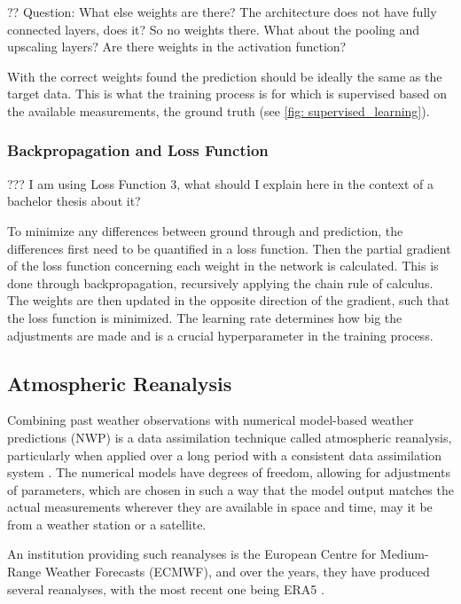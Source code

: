 ?? Question: What else weights are there? The architecture does not have fully connected layers, does it? So no weights there. What about the pooling and upscaling layers? Are there weights in the activation function?

With the correct weights found the prediction should be ideally the same as the target data. This is what the training process is for which is supervised based on the available measurements, the ground truth (see \autoref{fig: supervised_learning}). 

\subsubsection*{Backpropagation and Loss Function}

??? I am using Loss Function 3, what should I explain here in the context of a bachelor thesis about it?

To minimize any differences between ground through and prediction, the differences first need to be quantified in a loss function. Then the partial gradient of the loss function concerning each weight in the network is calculated. This is done through backpropagation, recursively applying the chain rule of calculus. The weights are then updated in the opposite direction of the gradient, such that the loss function is minimized. The learning rate determines how big the adjustments are made and is a crucial hyperparameter in the training process. 

\newpage

\subsection{Atmospheric Reanalysis}
 
Combining past weather observations with numerical model-based weather predictions (NWP)
is a data assimilation technique called atmospheric reanalysis, particularly when applied over a long period with a consistent data assimilation system \cite{Poli2016ERA20C, ECMWF2020dataassimilation}. The numerical models have degrees of freedom, allowing for adjustments of parameters, which are chosen in such a way that the model output matches the actual measurements wherever they are available in space and time, may it be from a weather station or a satellite.

An institution providing such reanalyses is the European Centre for Medium-Range Weather Forecasts (ECMWF), and over the years, they have produced several reanalyses, with the most recent one being ERA5 \cite{Hersbach2020ERA5quality}.

